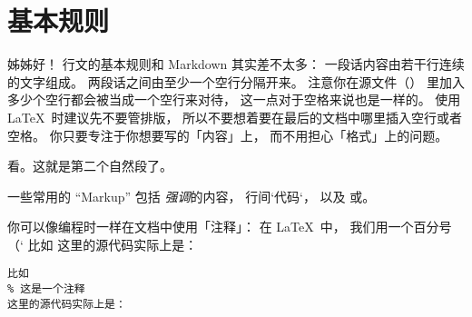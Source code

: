 
\section{基本规则}

姊姊好！
行文的基本规则和 Markdown 其实差不太多：
一段话内容由若干行连续的文字组成。
两段话之间由至少一个空行分隔开来。
注意你在源文件（）
里加入多少个空行都会被当成一个空行来对待，
这一点对于空格来说也是一样的。
使用 \LaTeX\ 时建议先不要管排版，
所以不要想着要在最后的文档中哪里插入空行或者空格。
你只要专注于你想要写的「内容」上，
而不用担心「格式」上的问题。

看。这就是第二个自然段了。

一些常用的 ``Markup'' 包括%
    \emph{强调}的内容，
    行间\code`代码`，
    以及
    或。

你可以像编程时一样在文档中使用「注释」：
在 \LaTeX\ 中，
我们用一个百分号（\code`%
比如
这里的源代码实际上是：
\begin{lstlisting}[language={[LaTeX]TeX}]
比如
% 这是一个注释
这里的源代码实际上是：
\end{lstlisting}

